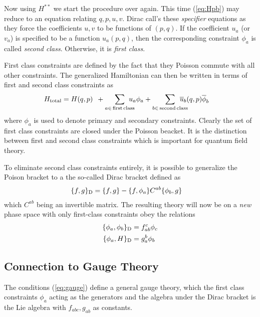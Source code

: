 \documentclass[notitlepage,amsmath,amssymb,aps, pra, 10pt]{revtex4-1}
\begin{document}
    Now using $H^{**}$ we start the procedure over again. This time (\ref{eq:Hpb}) may reduce to an equation relating $q, p, u, v$. Dirac call's these \emph{specifier} equations as they force the coefficients $u, v$ to be functions of $(p,q)$. If the coefficient $u_a$ (or $v_a$) is specified to be a function $u_a(p,q)$, then the corresponding constraint $\phi_a$ is called \emph{second class}. Otherwise, it is \emph{first class}.

    First class constraints are defined by the fact that they Poisson commute with all other constraints. The generalized Hamiltonian can then be written in terms of first and second class constraints as
    \begin{align}
        H_{\rm total} &= H(q,p) \,\,\, + \sum_{a\in \,\rm{first\,class}}\!\!\!\!\!\!u_a \phi_a + \sum_{b\in\,\rm{second\,class}}\!\!\! \!\!\!\!\!\overline {u}_b(q,p) \overline{\phi}_b
    \end{align}
    where $\phi_a$ is used to denote primary and secondary constraints. Clearly the set of first class constraints are closed under the Poisson beacket. It is the distinction between first and second class constraints which is important for quantum field theory.

    To eliminate second class constraints entirely, it is possible to generalize the Poison bracket to a the so-called Dirac bracket defined as
    \begin{align}
        \{f, g\}_{\rm D}  &= \{f, g\} - \{f, \phi_a\} C^{ab} \{\phi_b, g\}
    \end{align}
    which $ C^{ab}$ being an invertible matrix. The resulting theory will now be on a \emph{new} phase space with only first-class constraints obey the relations
    \begin{align}
        \label{eq:gauge}
        \{\phi_a, \phi_b\}_{\rm D}  &= f_{ab}^{c} \phi_c\\
        \{\phi_a, H\}_{\rm D}  &= g_a^{b} \phi_b
    \end{align}

    \subsection{Connection to Gauge Theory}

        The conditions (\ref{eq:gauge}) define a general gauge theory, which the first class constraints $\phi_a$ acting as the generators and the algebra under the Dirac bracket is the Lie algebra with $f_{abc}, g_{ab}$ as constants.
\end{document}
